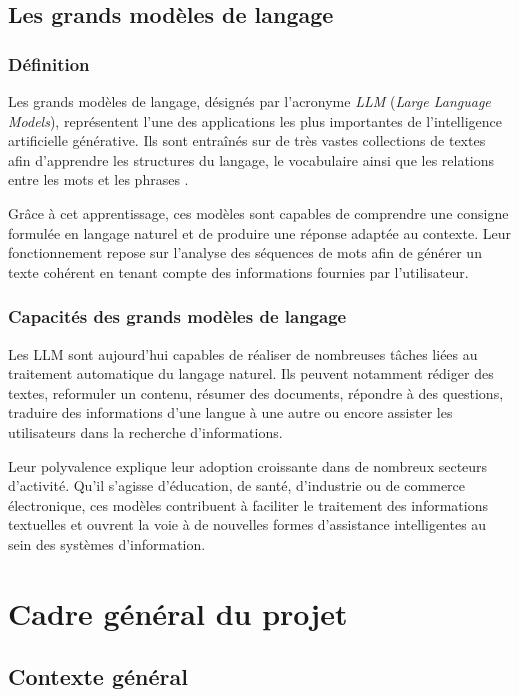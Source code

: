 \subsection{Les grands modèles de langage}

\subsubsection{Définition}

Les grands modèles de langage, désignés par l'acronyme \textit{LLM} (\textit{Large Language Models}), représentent l'une des applications les plus importantes de l'intelligence artificielle générative. Ils sont entraînés sur de très vastes collections de textes afin d'apprendre les structures du langage, le vocabulaire ainsi que les relations entre les mots et les phrases .

Grâce à cet apprentissage, ces modèles sont capables de comprendre une consigne formulée en langage naturel et de produire une réponse adaptée au contexte. Leur fonctionnement repose sur l'analyse des séquences de mots afin de générer un texte cohérent en tenant compte des informations fournies par l'utilisateur.

\subsubsection{Capacités des grands modèles de langage}

Les LLM sont aujourd'hui capables de réaliser de nombreuses tâches liées au traitement automatique du langage naturel. Ils peuvent notamment rédiger des textes, reformuler un contenu, résumer des documents, répondre à des questions, traduire des informations d'une langue à une autre ou encore assister les utilisateurs dans la recherche d'informations.

Leur polyvalence explique leur adoption croissante dans de nombreux secteurs d'activité. Qu'il s'agisse d'éducation, de santé, d'industrie ou de commerce électronique, ces modèles contribuent à faciliter le traitement des informations textuelles et ouvrent la voie à de nouvelles formes d'assistance intelligentes au sein des systèmes d'information.




\section{Cadre général du projet}

\subsection{Contexte général}

